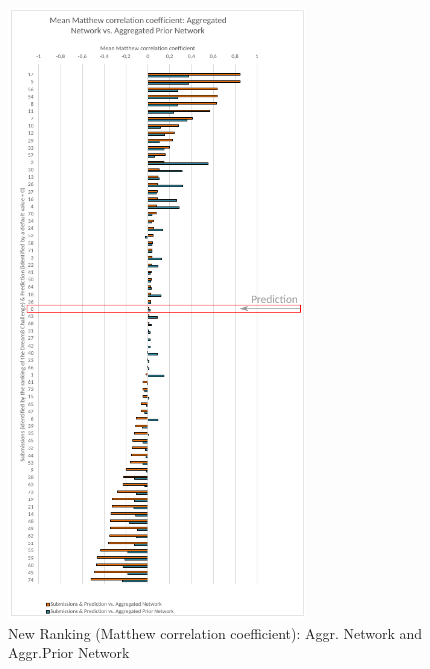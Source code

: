 \begin{figure}[H]
\centering
\includegraphics[width=0.7\textwidth]{./Bilder/Scoring/dreamchallenge/MeanMcc_vertical_comparison2.pdf}
\caption[New Ranking: Matthew correlation coefficient]{New Ranking (Matthew correlation coefficient): Aggr. Network and Aggr.Prior Network}
\label{fig:}
\end{figure}

